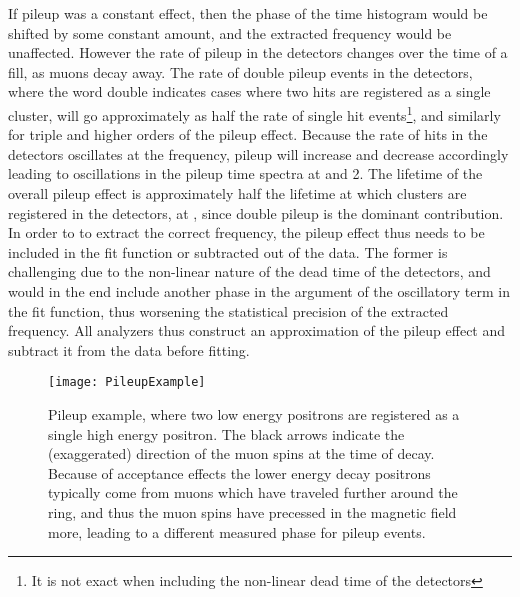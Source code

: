 If pileup was a constant effect, then the phase of the time histogram would be shifted by some constant amount, and the extracted \wa frequency would be unaffected. However the rate of pileup in the detectors changes over the time of a fill, as muons decay away. The rate of double pileup events in the detectors, where the word double indicates cases where two hits are registered as a single cluster, will go approximately as half the rate of single hit events\footnote{It is not exact when including the non-linear dead time of the detectors}, and similarly for triple and higher orders of the pileup effect. Because the rate of hits in the detectors oscillates at the \gmtwo frequency, pileup will increase and decrease accordingly leading to oscillations in the pileup time spectra at \wa and 2\wa. The lifetime of the overall pileup effect is approximately half the lifetime at which clusters are registered in the detectors, at \taumu, since double pileup is the dominant contribution. In order to to extract the correct \wa frequency, the pileup effect thus needs to be included in the fit function or subtracted out of the data. The former is challenging due to the non-linear nature of the dead time of the detectors, and would in the end include another phase in the argument of the oscillatory term in the fit function, thus worsening the statistical precision of the extracted \wa frequency. All analyzers thus construct an approximation of the pileup effect and subtract it from the data before fitting.




\begin{figure}[]
    \centering
    \texttt{[image: PileupExample]}
    \caption[Pileup example]{Pileup example, where two low energy positrons are registered as a single high energy positron. The black arrows indicate the (exaggerated) direction of the muon spins at the time of decay. Because of acceptance effects the lower energy decay positrons typically come from muons which have traveled further around the ring, and thus the muon spins have precessed in the magnetic field more, leading to a different measured \gmtwo phase for pileup events.}
    \label{fig:PileupExample}
\end{figure}


